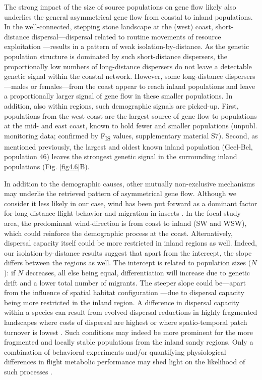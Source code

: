 \documentclass[10pt, twoside]{book} %
\begin{document}
	The strong impact of the size of source populations on gene flow likely also underlies the general asymmetrical gene flow from coastal to inland populations. In the well-connected, stepping stone landscape at the (west) coast, short-distance dispersal---dispersal related to routine movements of resource exploitation \citep{vandyck2005}---results in a pattern of weak isolation-by-distance. As the genetic population structure is dominated by such short-distance dispersers, the proportionally low numbers of long-distance dispersers do not leave a detectable genetic signal within the coastal network. However, some long-distance dispersers---males or females---from the coast appear to reach inland populations and leave a proportionally larger signal of gene flow in these smaller populations. In addition, also within regions, such demographic signals are picked-up. First, populations from the west coast are the largest source of gene flow to populations at the mid- and east coast, known to hold fewer and smaller populations (unpubl. monitoring data; confirmed by F\textsubscript{IS} values, supplementary material S7). Second, as mentioned previously, the largest and oldest known inland population (Geel-Bel, population 46) leaves the strongest genetic signal in the surrounding inland populations (Fig. \ref{fig4.6}B).\\
	\clearpage
	
	In addition to the demographic causes, other mutually non-exclusive mechanisms may underlie the retrieved pattern of asymmetrical gene flow. Although we consider it less likely in our case, wind has been put forward as a dominant factor for long-distance flight behavior and migration in insects \citep{alerstam2011, knight2019, leitch2021}. In the focal study area, the predominant wind-direction is from coast to inland (SW and WSW), which could reinforce the demographic process at the coast. Alternatively, dispersal capacity itself could be more restricted in inland regions as well. Indeed, our isolation-by-distance results suggest that apart from the intercept, the slope differs between the regions as well. The intercept is related to population sizes ($N$): if $N$ decreases, all else being equal, differentiation will increase due to genetic drift and a lower total number of migrants. The steeper slope could be---apart from the influence of spatial habitat configuration \citep{vanstrien2015}---due to dispersal capacity being more restricted in the inland region. A difference in dispersal capacity within a species can result from evolved dispersal reductions in highly fragmented landscapes \citep{cheptou2017} where costs of dispersal are highest or where spatio-temporal patch turnover is lowest \citep{bowler2005, bonte2012, duputie2013}. Such conditions may indeed be more prominent for the more fragmented and locally stable populations from the inland sandy regions. Only a combination of behavioral experiments and/or quantifying physiological differences in flight metabolic performance may shed light on the likelihood of such processes \citep{hanski2004}.\\
	
\end{document}
